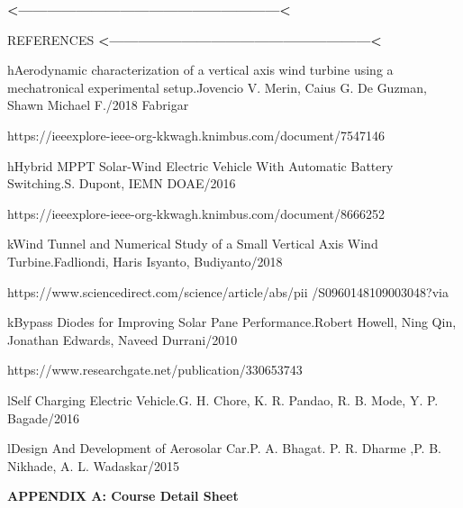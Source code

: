 \documentclass[a4paper,12pt]{article}
\begin{document}
\newpage
\thispagestyle{empty}
\vspace*{0.25\textheight}
\begin{center}
\begin{center}
{\bfseries\LARGE <------------------------------------------------------<}



{\scshape\Huge REFERENCES}
{\bfseries\LARGE <------------------------------------------------------<}
\end{center}
\end{center}
\newpage
\begin{thebibliography}{REFERENCES}

\bibitem hAerodynamic characterization of a vertical axis wind turbine using a mechatronical experimental setup.Jovencio V. Merin, Caius G. De Guzman, Shawn Michael F./2018
Fabrigar

https://ieeexplore-ieee-org-kkwagh.knimbus.com/document/7547146


\bibitem hHybrid MPPT Solar-Wind Electric Vehicle With Automatic Battery Switching.S. Dupont, IEMN DOAE/2016

https://ieeexplore-ieee-org-kkwagh.knimbus.com/document/8666252


\bibitem kWind Tunnel and Numerical Study of a Small Vertical Axis Wind Turbine.Fadliondi, Haris Isyanto, Budiyanto/2018

https://www.sciencedirect.com/science/article/abs/pii
/S0960148109003048?via


\bibitem kBypass Diodes for Improving Solar Pane Performance.Robert Howell, Ning Qin, Jonathan Edwards, Naveed Durrani/2010

https://www.researchgate.net/publication/330653743

\bibitem lSelf Charging Electric Vehicle.G. H. Chore, K. R. Pandao, R. B. Mode, Y. P. Bagade/2016

\bibitem lDesign And Development of Aerosolar Car.P. A. Bhagat. P. R. Dharme ,P. B. Nikhade, A. L. Wadaskar/2015

\end{thebibliography}

\appendix
\newpage
\thispagestyle{empty}
\vspace*{0.25\textheight}
\begin{center}
\LARGE\textbf{APPENDIX A: Course Detail Sheet}
\end{center}
\newpage

\newpage
\end{document}
